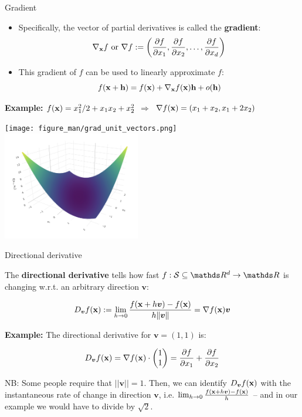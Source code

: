 \documentclass[11pt,compress,t,notes=noshow, xcolor=table]{beamer}
\begin{document}
\begin{vbframe}{Gradient}

\begin{itemize}
    \item Specifically, the vector of partial derivatives is called the \textbf{gradient}:
        \begin{equation*}
        \nabla_{\mathbf{x}} f \text{ or }   \nabla f := 
            \left(\frac{\partial f}{\partial x_1}, \frac{\partial f}{\partial x_2}, \ldots, \frac{\partial f}{\partial x_d}\right)
        \end{equation*}
    \item This gradient of $f$ can be used to linearly approximate $f$:
    $$
    f(\mathbf{x}+\mathbf{h})=f(\mathbf{x})+\nabla_{\mathbf{x}}f(\mathbf{x}) \mathbf{h}+o(\mathbf{h})
    $$
\end{itemize}

\vspace{0.5\baselineskip}

\textbf{Example:} $f(\mathbf{x}) = x_1^2/2 + x_1 x_2 + x_2^2$ $\Rightarrow$ $\nabla f(\mathbf{x}) = (x_1 + x_2, x_1 + 2x_2)$

\vspace{-0.5\baselineskip}

\begin{center}
	\texttt{[image: figure\_man/grad\_unit\_vectors.png]} ~~~ \includegraphics[width=0.45\textwidth]{figure_man/gradient2.png}
\end{center}

\end{vbframe}

\begin{vbframe}{Directional derivative}

The \textbf{directional derivative} tells how fast $f: \mathcal{S}\subseteq \R^d \to \R$ is changing w.r.t. an arbitrary direction $\bm{v}$:

 $$
   D_{\bm{v}} f(\mathbf{x}) := \lim_{h \to 0} \frac{f(\mathbf{x} + h \bm v) - f(\mathbf{x})}{h \|\bm v\|} = \nabla f(\mathbf{x}) \bm v
 $$


\textbf{Example: } The directional derivative for $\bm{v} = (1, 1)$ is:

$$
D_{\bm{v}} f(\mathbf{x}) = \nabla f(\mathbf{x}) \cdot \begin{pmatrix} 1 \\1\end{pmatrix} = \frac{\partial f}{\partial x_1} + \frac{\partial f}{\partial x_2}
$$

NB: Some people require that $||\bm{v}|| = 1$. Then, we can identify $D_{\bm{v}} f(\mathbf{x})$ with the instantaneous rate of change in direction $\bm{v}$, i.e. $\lim_{h \to 0} \frac{f(\mathbf{x} + h \bm v) - f(\mathbf{x})}{h}$ -- and in our example we would have to divide by $\sqrt{2}$.

\end{vbframe}
\end{document}
